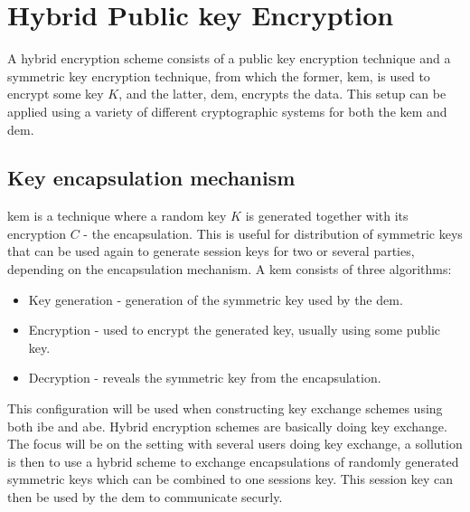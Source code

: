 \section{Hybrid Public key Encryption}\label{sec:hybrid}
A hybrid encryption scheme \cite{hybrid_enc} consists of a public key encryption technique and a symmetric key encryption technique, from which the former, \gls{kem}, is used to encrypt some key $K$, and the latter, \gls{dem}, encrypts the data. This setup can be applied using a variety of different cryptographic systems for both the \gls{kem} and \gls{dem}. 

\subsection{Key encapsulation mechanism}
\Gls{kem} \cite{kem_kurosawaP14} is a technique where a random key $K$ is generated together with its encryption $C$ - the encapsulation. This is useful for distribution of symmetric keys that can be used again to generate session keys for two or several parties, depending on the encapsulation mechanism. A \gls{kem} consists of three algorithms:
\begin{itemize}
\item Key generation - generation of the symmetric key used by the \gls{dem}.
\item Encryption - used to encrypt the generated key, usually using some public key.
\item Decryption - reveals the symmetric key from the encapsulation.
\end{itemize}

This configuration will be used when constructing key exchange schemes using both \gls{ibe} and \gls{abe}. Hybrid encryption schemes are basically doing key exchange. The focus will be on the setting with several users doing key exchange, a sollution is then to use a hybrid scheme to exchange encapsulations of randomly generated symmetric keys which can be combined to one sessions key. This session key can then be used by the \gls{dem} to communicate securly.




